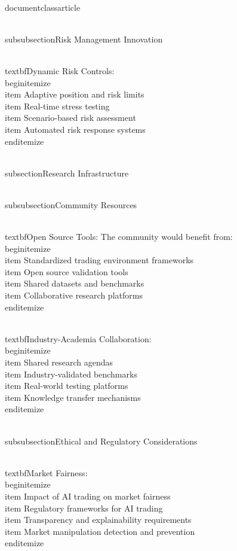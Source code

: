\\documentclass{article}
\begin{document}
\\subsubsection{Risk Management Innovation}

\\textbf{Dynamic Risk Controls}:
\\begin{itemize}
\\item Adaptive position and risk limits
\\item Real-time stress testing
\\item Scenario-based risk assessment
\\item Automated risk response systems
\\end{itemize}

\\subsection{Research Infrastructure}

\\subsubsection{Community Resources}

\\textbf{Open Source Tools}:
The community would benefit from:
\\begin{itemize}
\\item Standardized trading environment frameworks
\\item Open source validation tools
\\item Shared datasets and benchmarks
\\item Collaborative research platforms
\\end{itemize}

\\textbf{Industry-Academia Collaboration}:
\\begin{itemize}
\\item Shared research agendas
\\item Industry-validated benchmarks
\\item Real-world testing platforms
\\item Knowledge transfer mechanisms
\\end{itemize}

\\subsubsection{Ethical and Regulatory Considerations}

\\textbf{Market Fairness}:
\\begin{itemize}
\\item Impact of AI trading on market fairness
\\item Regulatory frameworks for AI trading
\\item Transparency and explainability requirements
\\item Market manipulation detection and prevention
\\end{itemize}
\end{document}
